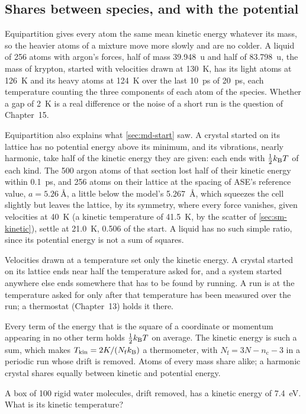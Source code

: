 \subsection*{Shares between species, and with the potential}

Equipartition gives every atom the same mean kinetic energy whatever its
mass, so the heavier atoms of a mixture move more slowly and are no
colder. A liquid of 256 atoms with argon's forces, half of mass
\SI{39.948}{\amu} and half of \SI{83.798}{\amu}, the mass of krypton,
started with velocities drawn at \SI{130}{\kelvin}, has its light atoms at
\SI{126}{\kelvin} and its heavy atoms at \SI{124}{\kelvin} over the last
\SI{10}{\pico\second} of \SI{20}{\pico\second}, each temperature counting
the three components of each atom of the species. Whether a gap of
\SI{2}{\kelvin} is a real difference or the noise of a short run is the
question of Chapter~15.

Equipartition also explains what \cref{sec:md-start} saw. A crystal
started on its lattice has no potential energy above its minimum, and its
vibrations, nearly harmonic, take half of the kinetic energy they are
given: each ends with $\frac12k_{\mathrm{B}} T$ of each kind. The 500 argon atoms of
that section lost half of their kinetic energy within
\SI{0.1}{\pico\second}, and 256 atoms on their lattice at the spacing of
ASE's reference value\cite{Larsen2017}, $a = \SI{5.26}{\angstrom}$, a
little below the model's \SI{5.267}{\angstrom}, which squeezes the cell
slightly but leaves the lattice, by its symmetry, where every force
vanishes, given velocities at \SI{40}{\kelvin}
(a kinetic temperature of \SI{41.5}{\kelvin}, by the scatter of
\cref{sec:sm-kinetic}), settle at \SI{21.0}{\kelvin}, 0.506 of the start.
A liquid has no such simple ratio, since its potential energy is not a sum
of squares.

\begin{practice}
Velocities drawn at a temperature set only the kinetic energy. A crystal
started on its lattice ends near half the temperature asked for, and a
system started anywhere else ends somewhere that has to be found by
running. A run is at the temperature asked for only after that
temperature has been measured over the run; a thermostat (Chapter~13)
holds it there.
\end{practice}

\begin{keyidea}
Every term of the energy that is the square of a coordinate or momentum
appearing in no other term holds $\frac12k_{\mathrm{B}} T$ on average. The kinetic energy is such a sum, which
makes $T_{\mathrm{kin}} = 2K/(N_{\mathrm f}k_{\mathrm{B}})$ a thermometer, with
$N_{\mathrm f} = 3N - n_{\mathrm c} - 3$ in a periodic run whose drift is
removed. Atoms of every mass share alike; a harmonic crystal shares
equally between kinetic and potential energy.
\end{keyidea}


\begin{selfcheck}
A box of 100 rigid water molecules, drift removed, has a kinetic energy
of \SI{7.4}{\electronvolt}. What is its kinetic temperature?
\end{selfcheck}
